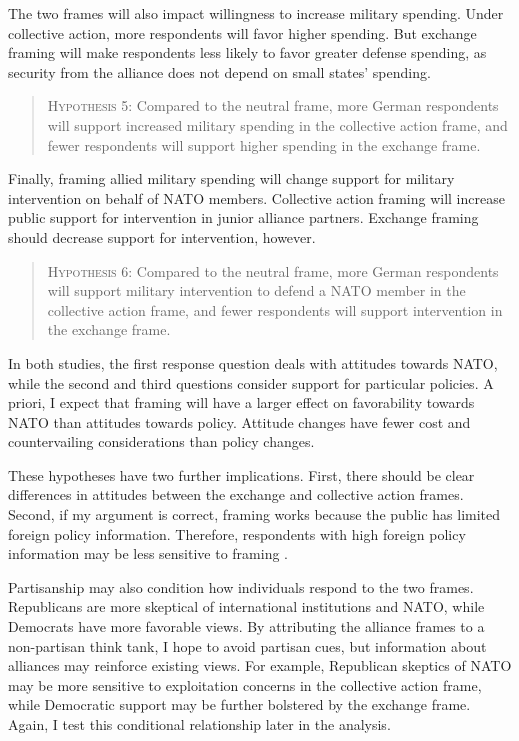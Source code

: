 \documentclass[12pt]{article}
\begin{document}
The two frames will also impact willingness to increase military spending. 
Under collective action, more respondents will favor higher spending. 
But exchange framing will make respondents less likely to favor greater defense spending, as security from the alliance does not depend on small states' spending. 


\begin{quote}
\textsc{Hypothesis 5}: Compared to the neutral frame, more German respondents will support increased military spending in the collective action frame, and fewer respondents will support higher spending in the exchange frame.
\end{quote}


Finally, framing allied military spending will change support for military intervention on behalf of NATO members. 
Collective action framing will increase public support for intervention in junior alliance partners. 
Exchange framing should decrease support for intervention, however. 


\begin{quote}
\textsc{Hypothesis 6}: Compared to the neutral frame, more German respondents will support military intervention to defend a NATO member in the collective action frame, and fewer respondents will support intervention in the exchange frame. 
\end{quote} 



In both studies, the first response question deals with attitudes towards NATO, while the second and third questions consider support for particular policies. 
A priori, I expect that framing will have a larger effect on favorability towards NATO than attitudes towards policy. 
Attitude changes have fewer cost and countervailing considerations than policy changes. 


These hypotheses have two further implications. 
First, there should be clear differences in attitudes between the exchange and collective action frames. 
Second, if my argument is correct, framing works because the public has limited foreign policy information. 
Therefore, respondents with high foreign policy information may be less sensitive to framing \citep{Druckman2001}. 


Partisanship may also condition how individuals respond to the two frames. 
Republicans are more skeptical of international institutions and NATO, while Democrats have more favorable views.
By attributing the alliance frames to a non-partisan think tank, I hope to avoid partisan cues, but information about alliances may reinforce existing views. 
For example, Republican skeptics of NATO may be more sensitive to exploitation concerns in the collective action frame, while Democratic support may be further bolstered by the exchange frame. 
Again, I test this conditional relationship later in the analysis. 
\end{document}
